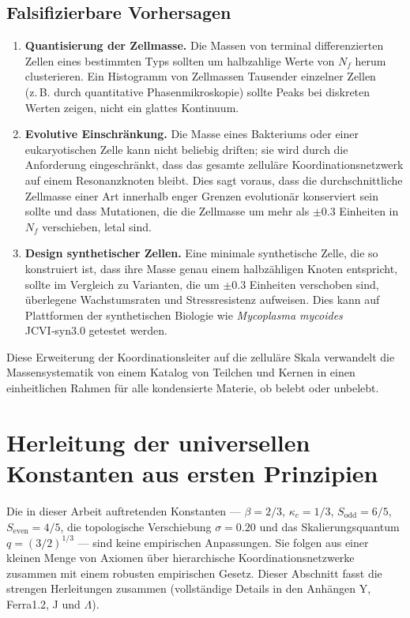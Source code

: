 \documentclass[11pt,a4paper]{article}
\begin{document}
	\subsection{Falsifizierbare Vorhersagen}
	\begin{enumerate}
		\item \textbf{Quantisierung der Zellmasse.} Die Massen von terminal differenzierten Zellen eines bestimmten Typs sollten um halbzahlige Werte von \(N_f\) herum clusterieren. Ein Histogramm von Zellmassen Tausender einzelner Zellen (z. B. durch quantitative Phasenmikroskopie) sollte Peaks bei diskreten Werten zeigen, nicht ein glattes Kontinuum.
		\item \textbf{Evolutive Einschränkung.} Die Masse eines Bakteriums oder einer eukaryotischen Zelle kann nicht beliebig driften; sie wird durch die Anforderung eingeschränkt, dass das gesamte zelluläre Koordinationsnetzwerk auf einem Resonanzknoten bleibt. Dies sagt voraus, dass die durchschnittliche Zellmasse einer Art innerhalb enger Grenzen evolutionär konserviert sein sollte und dass Mutationen, die die Zellmasse um mehr als \(\pm 0.3\) Einheiten in \(N_f\) verschieben, letal sind.
		\item \textbf{Design synthetischer Zellen.} Eine minimale synthetische Zelle, die so konstruiert ist, dass ihre Masse genau einem halbzähligen Knoten entspricht, sollte im Vergleich zu Varianten, die um \(\pm 0.3\) Einheiten verschoben sind, überlegene Wachstumsraten und Stressresistenz aufweisen. Dies kann auf Plattformen der synthetischen Biologie wie \textit{Mycoplasma mycoides} JCVI‑syn3.0 getestet werden.
	\end{enumerate}
	
	Diese Erweiterung der Koordinationsleiter auf die zelluläre Skala verwandelt die Massensystematik von einem Katalog von Teilchen und Kernen in einen einheitlichen Rahmen für alle kondensierte Materie, ob belebt oder unbelebt.
	
	\section{Herleitung der universellen Konstanten aus ersten Prinzipien}
	\label{sec:first-principles}
	
	Die in dieser Arbeit auftretenden Konstanten — \(\beta = 2/3\), \(\kappa_c = 1/3\), \(S_{\mathrm{odd}}=6/5\), \(S_{\mathrm{even}}=4/5\), die topologische Verschiebung \(\sigma = 0.20\) und das Skalierungsquantum \(q = (3/2)^{1/3}\) — sind keine empirischen Anpassungen. Sie folgen aus einer kleinen Menge von Axiomen über hierarchische Koordinationsnetzwerke zusammen mit einem robusten empirischen Gesetz. Dieser Abschnitt fasst die strengen Herleitungen zusammen (vollständige Details in den Anhängen Y, Ferra1.2, J und \(\Lambda\)).
	
\end{document}

